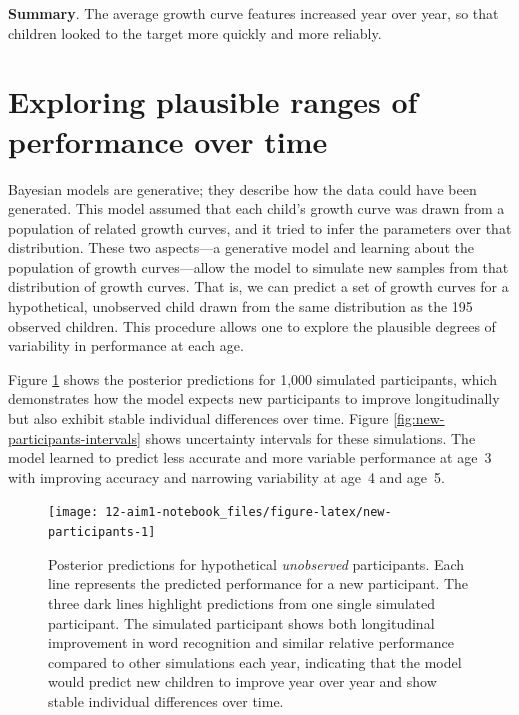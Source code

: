 \documentclass [11pt, proquest] {uwthesis}[2015/03/03]
\begin{document}
\textbf{Summary}. The average growth curve features increased year over
year, so that children looked to the target more quickly and more
reliably.

\section{Exploring plausible ranges of performance over
time}\label{exploring-plausible-ranges-of-performance-over-time}

Bayesian models are generative; they describe how the data could have
been generated. This model assumed that each child's growth curve was
drawn from a population of related growth curves, and it tried to infer
the parameters over that distribution. These two aspects---a generative
model and learning about the population of growth curves---allow the
model to simulate new samples from that distribution of growth curves.
That is, we can predict a set of growth curves for a hypothetical,
unobserved child drawn from the same distribution as the 195 observed
children. This procedure allows one to explore the plausible degrees of
variability in performance at each age.

Figure \ref{fig:new-participants} shows the posterior predictions for
1,000 simulated participants, which demonstrates how the model expects
new participants to improve longitudinally but also exhibit stable
individual differences over time. Figure
\ref{fig:new-participants-intervals} shows uncertainty intervals for
these simulations. The model learned to predict less accurate and more
variable performance at age~3 with improving accuracy and narrowing
variability at age~4 and age~5.









\begin{figure}
\texttt{[image: 12-aim1-notebook\_files/figure-latex/new-participants-1]} \caption{Posterior predictions for hypothetical
\emph{unobserved} participants. Each line represents the predicted
performance for a new participant. The three dark lines highlight
predictions from one single simulated participant. The simulated
participant shows both longitudinal improvement in word recognition and
similar relative performance compared to other simulations each year,
indicating that the model would predict new children to improve year
over year and show stable individual differences over time.}\label{fig:new-participants}
\end{figure}
\end{document}
